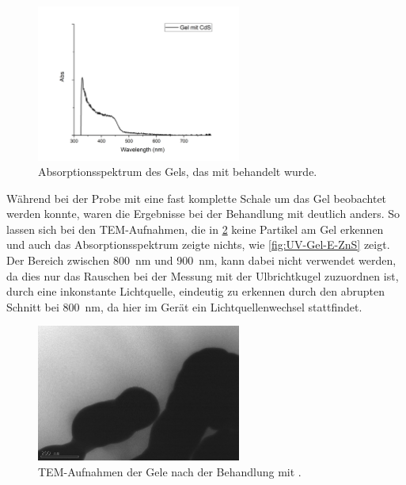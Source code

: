 		\begin{figure}[H]
			\centering
			\includegraphics[width=0.6\textwidth]{Bilder/UV-Gel-E-CdS} 	
			\caption{Absorptionsspektrum des Gels, das mit  behandelt wurde.}
			\label{fig:UV-Gel-E-CdS}
		\end{figure}
	
		Während bei der Probe mit  eine fast komplette Schale um das Gel beobachtet werden konnte, waren die Ergebnisse bei der Behandlung mit  deutlich anders.
		So lassen sich bei den TEM-Aufnahmen, die in \cref{fig:Gel-E-ZnS} keine Partikel am Gel erkennen und auch das Absorptionsspektrum zeigte nichts, wie \cref{fig:UV-Gel-E-ZnS} zeigt. 
		Der Bereich zwischen \SI{800}{\nano\meter} und \SI{900}{\nano\meter}, kann dabei nicht verwendet werden, da dies nur das Rauschen bei der Messung mit der Ulbrichtkugel zuzuordnen ist, durch eine inkonstante Lichtquelle, eindeutig zu erkennen durch den abrupten Schnitt bei \SI{800}{\nano\meter}, da hier im Gerät ein Lichtquellenwechsel stattfindet.
		
		\begin{figure}[H]
			\centering
			\includegraphics[width=0.6\textwidth]{Bilder/Gel-E-ZnS} 	
			\caption{TEM-Aufnahmen der Gele nach der Behandlung mit .}
			\label{fig:Gel-E-ZnS}
		\end{figure}
		
